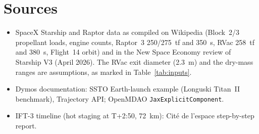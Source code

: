 \documentclass[11pt,a4paper]{article}
\begin{document}
\section*{Sources}
\begin{itemize}\small
  \item SpaceX Starship and Raptor data as compiled on Wikipedia (Block~2/3 propellant loads, engine counts, Raptor~3 250/275~tf and 350~s, RVac 258~tf and 380~s, Flight~14 orbit) and in the New Space Economy review of Starship V3 (April 2026). The RVac exit diameter (2.3~m) and the dry-mass ranges are assumptions, as marked in Table~\ref{tab:inputs}.
  \item Dymos documentation: SSTO Earth-launch example (Longuski Titan~II benchmark), Trajectory API; OpenMDAO \texttt{JaxExplicitComponent}.
  \item IFT-3 timeline (hot staging at T+2:50, 72~km): Cit\'e de l'espace step-by-step report.
\end{itemize}
\end{document}
